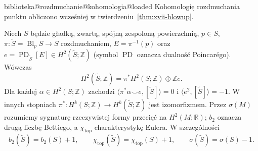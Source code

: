 \ifcsname biblioteka@rozdmuchanie@kohomologia@loaded\endcsname
Kohomologię rozdmuchania punktu obliczono wcześniej
w twierdzeniu~\ref{thm:xvii-blowup}.
\else
\expandafter\gdef\csname biblioteka@rozdmuchanie@kohomologia@loaded\endcsname{}
\begin{twierdzenie}
\label{tw:ga10-blowup}\label{thm:xvii-blowup}
Niech $S$ będzie gładką, zwartą, spójną zespoloną powierzchnią,
$p\in S$, $\pi:\widetilde S=\operatorname{Bl}_pS\to S$ rozdmuchaniem,
$E=\pi^{-1}(p)$ oraz $e=\operatorname{PD}_{\widetilde S}[E]\in
H^2(\widetilde S;\mathbb Z)$ (symbol $\operatorname{PD}$ oznacza dualność
Poincarégo). Wówczas
\[
H^2(\widetilde S;\mathbb Z)=\pi^*H^2(S;\mathbb Z)\oplus\mathbb Z e.
\]
Dla każdej $\alpha\in H^2(S;\mathbb Z)$ zachodzi
$\langle \pi^*\alpha\smile e,[\widetilde S]\rangle=0$ i
$\langle e^2,[\widetilde S]\rangle=-1$.
W innych stopniach $\pi^*:H^k(S;\mathbb Z)\to
H^k(\widetilde S;\mathbb Z)$ jest izomorfizmem.
Przez $\sigma(M)$ rozumiemy sygnaturę rzeczywistej formy
przecięć na $H^2(M;\mathbb R)$; $b_2$ oznacza drugą liczbę
Bettiego, a $\chi_{\mathrm{top}}$ charakterystykę Eulera.
W szczególności
\[
 b_2(\widetilde S)=b_2(S)+1,\qquad
 \chi_{\mathrm{top}}(\widetilde S)=\chi_{\mathrm{top}}(S)+1,
 \qquad \sigma(\widetilde S)=\sigma(S)-1.
\]
\end{twierdzenie}
